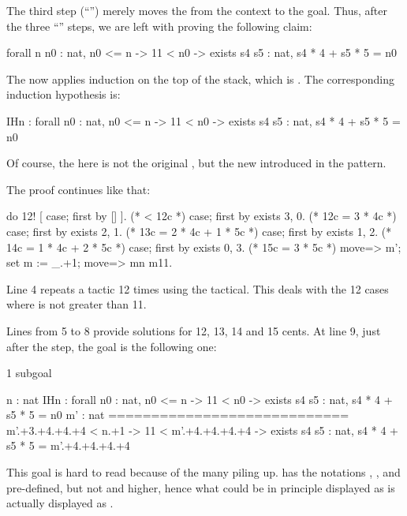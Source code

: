 The third step (``'') merely moves the  from the
context to the goal. Thus, after the three ``'' steps, we are
left with proving the following claim:

\begin{coqout}{}{}
forall n n0 : nat,
  n0 <= n -> 11 < n0 -> exists s4 s5 : nat, s4 * 4 + s5 * 5 = n0
\end{coqout}

The  now applies induction on the top of the stack, which
is . The corresponding induction hypothesis  is:

\begin{coqout}{}{}
IHn : forall n0 : nat,
      n0 <= n ->
      11 < n0 -> exists s4 s5 : nat, s4 * 4 + s5 * 5 = n0
\end{coqout}

Of course, the  here is not the original , but the new
 introduced in the \C{=>[|n IHn]} pattern.

The proof continues like that:

\lstset{firstnumber=4}
\begin{coq}{}{}
do 12! [ case; first by [] ]. (* < 12c *)
case; first by exists 3, 0.   (* 12c = 3 * 4c *)
case; first by exists 2, 1.   (* 13c = 2 * 4c + 1 * 5c *)
case; first by exists 1, 2.   (* 14c = 1 * 4c + 2 * 5c *)
case; first by exists 0, 3.   (* 15c = 3 * 5c *)
move=> m'; set m := _.+1; move=> mn m11.
\end{coq}
\lstset{firstnumber=1}

Line 4 repeats a tactic 12 times using the  tactical.
This deals with the 12 cases where  is not greater than 11.

Lines from 5 to 8 provide solutions for 12, 13, 14 and 15 cents.
At line 9, just after the  step, the goal is the following one:

\begin{coqout}{}{}
1 subgoal
  
  n : nat
  IHn : forall n0 : nat, n0 <= n -> 
	  11 < n0 -> exists s4 s5 : nat, s4 * 4 + s5 * 5 = n0
  m' : nat
  ============================
  m'.+3.+4.+4.+4 < n.+1 ->
    11 < m'.+4.+4.+4.+4 ->
      exists s4 s5 : nat, s4 * 4 + s5 * 5 = m'.+4.+4.+4.+4
\end{coqout}

This goal is hard to read because of the many  piling
up. \mcbMC{} has the notations ,
,  and  pre-defined, but not  and higher,
hence what could be in principle displayed as  is actually
displayed as .

